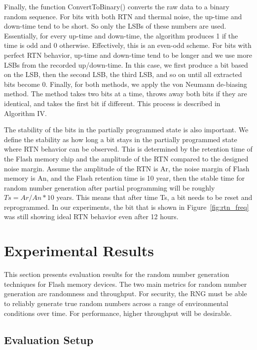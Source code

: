 Finally, the function ConvertToBinary() converts the raw data to a binary random sequence. For bits with both RTN and thermal noise, the up-time and down-time tend to be short. So only the LSBs of these numbers are used. Essentially, for every up-time and down-time, the algorithm produces 1 if the time is odd and 0 otherwise. Effectively, this is an even-odd scheme. For bits with perfect RTN behavior, up-time and down-time tend to be longer and we use more LSBs from the recorded up/down-time. In this case, we first produce a bit based on the LSB, then the second LSB, the third LSB, and so on until all extracted bits become 0. Finally, for both methods, we apply the von Neumann de-biasing method. The method takes two bits at a time, throws away both bits if they are identical, and takes the first bit if different. This process is described in Algorithm IV.

The stability of the bits in the partially programmed state is also important. We define the stability as how long a bit stays in the partially programmed state where RTN behavior can be observed. This is determined by the retention time of the Flash memory chip and the amplitude of the RTN compared to the designed noise margin. Assume the amplitude of the RTN is Ar, the noise margin of Flash memory is An, and the Flash retention time is 10 year, then the stable time for random number generation after partial programming will be roughly $Ts=Ar/An*10$ years. This means that after time Ts, a bit needs to be reset and reprogrammed. In our experiments, the bit that is shown in Figure~\ref{fig:rtn_freq} was still showing ideal RTN behavior even after 12 hours.

\section{Experimental Results}

This section presents evaluation results for the random number generation techniques for Flash memory devices. The two main metrics for random number generation are randomness and throughput. For security, the RNG must be able to reliably generate true random numbers across a range of environmental conditions over time. For performance, higher throughput will be desirable. 

\subsection{Evaluation Setup}

